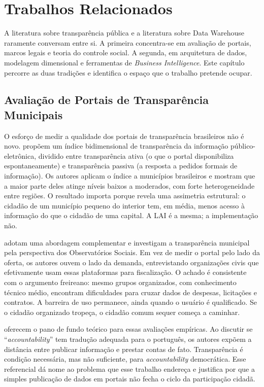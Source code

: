 \chapter{Trabalhos Relacionados}
\label{cap:trabalhos}

A literatura sobre transparência pública e a literatura sobre Data Warehouse raramente conversam entre si. A primeira concentra-se em avaliação de portais, marcos legais e teoria do controle social. A segunda, em arquitetura de dados, modelagem dimensional e ferramentas de \textit{Business Intelligence}. Este capítulo percorre as duas tradições e identifica o espaço que o trabalho pretende ocupar.

\section{Avaliação de Portais de Transparência Municipais}

O esforço de medir a qualidade dos portais de transparência brasileiros não é novo.  propõem um índice bidimensional de transparência da informação público-eletrônica, dividido entre transparência ativa (o que o portal disponibiliza espontaneamente) e transparência passiva (a resposta a pedidos formais de informação). Os autores aplicam o índice a municípios brasileiros e mostram que a maior parte deles atinge níveis baixos a moderados, com forte heterogeneidade entre regiões. O resultado importa porque revela uma assimetria estrutural: o cidadão de um município pequeno do interior tem, em média, menos acesso à informação do que o cidadão de uma capital. A LAI é a mesma; a implementação não.

 adotam uma abordagem complementar e investigam a transparência municipal pela perspectiva dos Observatórios Sociais. Em vez de medir o portal pelo lado da oferta, os autores ouvem o lado da demanda, entrevistando organizações civis que efetivamente usam essas plataformas para fiscalização. O achado é consistente com o argumento freireano: mesmo grupos organizados, com conhecimento técnico médio, encontram dificuldades para cruzar dados de despesas, licitações e contratos. A barreira de uso permanece, ainda quando o usuário é qualificado. Se o cidadão organizado tropeça, o cidadão comum sequer começa a caminhar.

 oferecem o pano de fundo teórico para essas avaliações empíricas. Ao discutir se ``\textit{accountability}'' tem tradução adequada para o português, os autores expõem a distância entre publicar informação e prestar contas de fato. Transparência é condição necessária, mas não suficiente, para \textit{accountability} democrática. Esse referencial dá nome ao problema que esse trabalho endereça e justifica por que a simples publicação de dados em portais não fecha o ciclo da participação cidadã.

